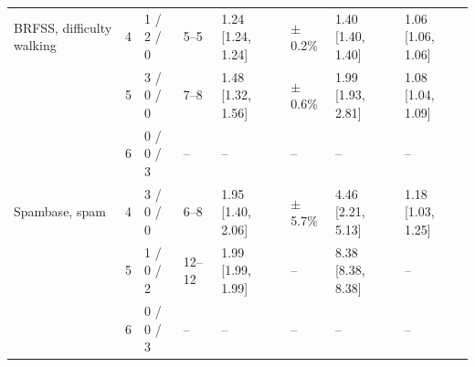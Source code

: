 \begin{table}[h]
\begin{tabular}{llllllll}
BRFSS, difficulty walking & 4 & 1 / 2 / 0 & 5--5 & 1.24 [1.24, 1.24] & $\pm$0.2\% & 1.40 [1.40, 1.40] & 1.06 [1.06, 1.06] \\
 & 5 & 3 / 0 / 0 & 7--8 & 1.48 [1.32, 1.56] & $\pm$0.6\% & 1.99 [1.93, 2.81] & 1.08 [1.04, 1.09] \\
 & 6 & 0 / 0 / 3 & -- & -- & -- & -- & -- \\
Spambase, spam & 4 & 3 / 0 / 0 & 6--8 & 1.95 [1.40, 2.06] & $\pm$5.7\% & 4.46 [2.21, 5.13] & 1.18 [1.03, 1.25] \\
 & 5 & 1 / 0 / 2 & 12--12 & 1.99 [1.99, 1.99] & -- & 8.38 [8.38, 8.38] & -- \\
 & 6 & 0 / 0 / 3 & -- & -- & -- & -- & -- \\
\bottomrule
\end{tabular}
\end{table}
